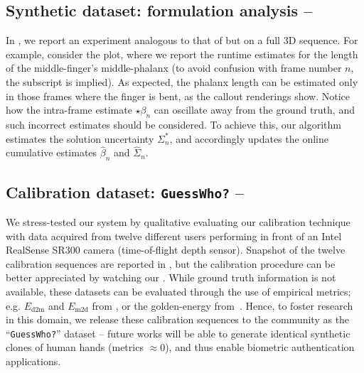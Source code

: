 \subsection{Synthetic dataset: formulation analysis -- }
\label{sec:analysis}
In , we report an experiment analogous to that of  but on a full 3D sequence. For example, consider the {\small \todo{$\beta_{[?]}$}} plot, where we report the runtime estimates for the length of the middle-finger's middle-phalanx (to avoid confusion with frame number $n$, the \todo{$[?]$} subscript is implied).
As expected, the phalanx length can be estimated only in those frames where the finger is bent, as the callout renderings show.
%
Notice how the intra-frame estimate {\small $\star\beta_n$} can oscillate away from the ground truth, and such incorrect estimates should be considered. To achieve this, our algorithm estimates the solution uncertainty {\small $\Sigma^*_n$}, and accordingly updates the online cumulative estimates {\small $\hat\beta_n$} and {\small $\hat\Sigma_n$}.


\subsection{Calibration dataset: \texttt{GuessWho?} -- }
\label{sec:evaldataset}
We stress-tested our system by qualitative evaluating our calibration technique with data acquired from twelve different users performing in front of an Intel RealSense SR300 camera (time-of-flight depth sensor). 
Snapshot of the twelve calibration sequences are reported in , but the calibration procedure can be better appreciated by watching our \VideoQualitative{}.
While ground truth information is not available, these datasets can be evaluated through the use of empirical metrics; e.g. $E_\text{d2m}$ and $E_\text{m2d}$ from \cite{tkach2016sphere}, or the golden-energy from~\cite{taylor2016joint}.
Hence, to foster research in this domain, we release these calibration sequences to the community as the ``\texttt{GuessWho?}'' dataset -- future works will be able to generate identical synthetic clones of human hands (metrics $\approx 0$), and thus enable biometric authentication applications.



